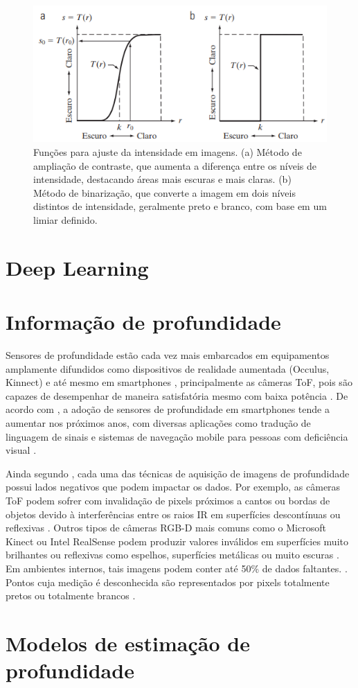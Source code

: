 \begin{figure}
    \centering   
    \includegraphics[width=\textwidth]{fig/ExemploTranformacaoIntensidade.png}
    \caption{Funções para ajuste da intensidade em imagens. (a) Método de ampliação de contraste, que aumenta a diferença entre os níveis de intensidade, destacando áreas mais escuras e mais claras. (b) Método de binarização, que converte a imagem em dois níveis distintos de intensidade, geralmente preto e branco, com base em um limiar definido.}
    \label{exemploTransformacaoIntensidade}
\end{figure}

\section{Deep Learning}

\section{Informação de profundidade}
Sensores de profundidade estão cada vez mais embarcados em equipamentos amplamente difundidos como dispositivos de realidade aumentada (Occulus, Kinnect) e até mesmo em smartphones \cite{du2020depthlab}, principalmente as câmeras ToF, pois são capazes de desempenhar de maneira satisfatória mesmo com baixa potência \cite{branscombe2018microsoft}. De acordo com \cite{xie2021ultradepth}, a adoção de sensores de profundidade em smartphones tende a aumentar nos próximos anos, com diversas aplicações como tradução de linguagem de sinais \cite{park2021enabling} e sistemas de navegação mobile para pessoas com deficiência visual \cite{see2022smartphone}.


Ainda segundo \cite{castellano2023performance}, cada uma das técnicas de aquisição de imagens de profundidade possui lados negativos que podem impactar os dados. Por exemplo, as câmeras ToF podem sofrer com invalidação de pixels próximos a cantos ou bordas de objetos devido à interferências entre os raios IR em superfícies descontínuas ou reflexivas \cite{hansard2012time}. Outros tipos de câmeras RGB-D mais comuns como o Microsoft Kinect ou Intel RealSense podem produzir valores inválidos em superfícies muito brilhantes ou reflexivas como espelhos, superfícies metálicas ou muito escuras \cite{zollhofer2019commodity}. Em ambientes internos, tais imagens podem conter até 50\% de dados faltantes. \cite{zhang2022indepth} \cite{zhang2018deep}. Pontos cuja medição é desconhecida são representados por pixels totalmente pretos ou totalmente brancos \cite{dourado2020multi}.
\section{Modelos de estimação de profundidade}
